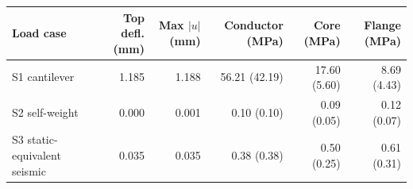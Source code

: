 \begin{tabular}{lrrrrr}
\toprule
Load case & Top defl. (mm) & Max $|u|$ (mm) & Conductor (MPa) & Core (MPa) & Flange (MPa) \\
\midrule
S1 cantilever & 1.185 & 1.188 & 56.21 (42.19) & 17.60 (5.60) & 8.69 (4.43) \\
S2 self-weight & 0.000 & 0.001 & 0.10 (0.10) & 0.09 (0.05) & 0.12 (0.07) \\
S3 static-equivalent seismic & 0.035 & 0.035 & 0.38 (0.38) & 0.50 (0.25) & 0.61 (0.31) \\
\bottomrule
\end{tabular}
